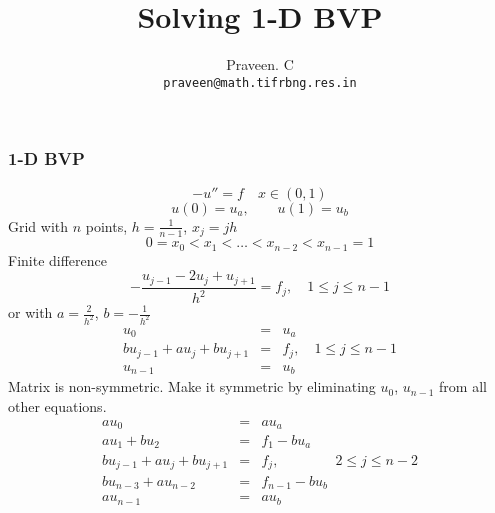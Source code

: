 \documentclass[10pt,xcolor=svgnames]{beamer}
\title[1D BVP] %
{Solving 1-D BVP}
\author[Praveen. C] %
{Praveen. C\\
{\tt praveen@math.tifrbng.res.in}}
\institute[TIFR-CAM] %
{
   \texttt{[image: tifr.png]}\\
   Tata Institute of Fundamental Research\\
   Center for Applicable Mathematics\\
   Bangalore 560065\\
{\tt http://math.tifrbng.res.in}
}
\begin{document}

\begin{frame}
  \titlepage
\end{frame}

\begin{frame}[allowframebreaks]
\frametitle{1-D BVP}
\[
-u'' = f \quad x \in (0,1)
\]
\[
u(0) = u_a, \qquad u(1) = u_b
\]
Grid with $n$ points, $h = \frac{1}{n-1}$, $x_j = j h$
\[
0 = x_0 < x_1 < \ldots < x_{n-2} < x_{n-1} = 1
\]
Finite difference
\[
- \frac{u_{j-1} - 2 u_j + u_{j+1}}{h^2} = f_j, \quad 1 \le j \le n-1
\]
or with $a = \frac{2}{h^2}$, $b = -\frac{1}{h^2}$
\begin{eqnarray*}
u_0 &=& u_a \\
b u_{j-1} + a u_j + b u_{j+1} &=& f_j, \quad 1 \le j \le n-1 \\
u_{n-1} &=& u_b
\end{eqnarray*}
Matrix is non-symmetric. Make it symmetric by eliminating $u_0$, $u_{n-1}$ from all other equations.
\begin{eqnarray*}
a u_0 &=& a u_a \\
 a u_1 + b u_{2} &=& f_1 - b u_a \\
b u_{j-1} + a u_j + b u_{j+1} &=& f_j, \qquad\qquad 2 \le j \le n-2 \\
b u_{n-3} + a u_{n-2} &=& f_{n-1} - b u_b \\
a u_{n-1} &=& a u_b
\end{eqnarray*}
\end{frame}
\end{document}
